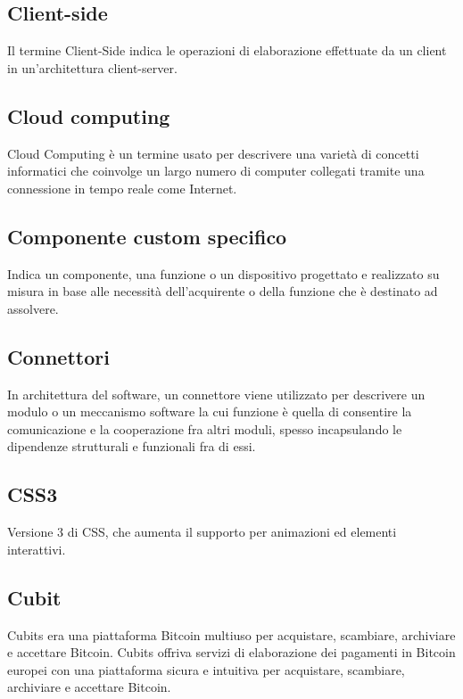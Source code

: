 \subsection{Client-side}
Il termine Client-Side indica le operazioni di elaborazione effettuate da un client in un'architettura client-server.

\subsection{Cloud computing}
Cloud Computing è un termine usato per descrivere una varietà di concetti informatici che coinvolge un largo numero di computer collegati tramite una connessione in tempo reale come Internet.

\subsection{Componente custom specifico}
Indica un componente, una funzione o un dispositivo progettato e realizzato su misura in base alle necessità dell'acquirente o della funzione che è destinato ad assolvere.

\subsection{Connettori}
In architettura del software, un connettore viene utilizzato per descrivere un modulo o un meccanismo software la cui funzione è quella di consentire la comunicazione e la cooperazione fra altri moduli, spesso incapsulando le dipendenze strutturali e funzionali fra di essi.

\subsection{CSS3}
Versione 3 di CSS, che aumenta il supporto per animazioni ed elementi interattivi.

\subsection{Cubit}
Cubits era una piattaforma Bitcoin multiuso per acquistare, scambiare, archiviare e accettare Bitcoin. Cubits offriva servizi di elaborazione dei pagamenti in Bitcoin europei con una piattaforma sicura e intuitiva per acquistare, scambiare, archiviare e accettare Bitcoin. 

